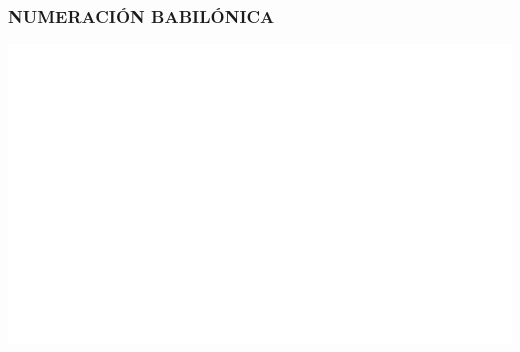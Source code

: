 \begin{frame}
  \frametitle{NUMERACIÓN BABILÓNICA}

  \begin{center}
    \includegraphics[width=\textwidth]{babylonian.pdf}
  \end{center}
\end{frame}

